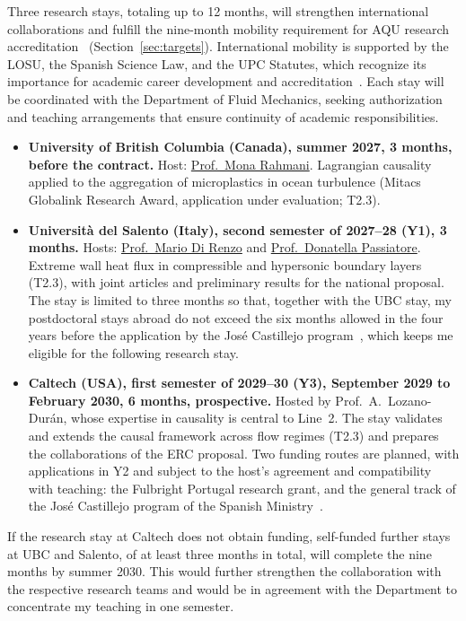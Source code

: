 \documentclass[11pt]{article}
\begin{document}
Three research stays, totaling up to 12 months, will strengthen international collaborations and fulfill the nine-month mobility requirement for AQU research accreditation~\cite{AQU2025} (Section~\ref{sec:targets}).
International mobility is supported by the LOSU, the Spanish Science Law, and the UPC Statutes, which recognize its importance for academic career development and accreditation~\cite{LOSU2023,LCTI2011,UPCStatutes2025}.
Each stay will be coordinated with the Department of Fluid Mechanics, seeking authorization and teaching arrangements that ensure continuity of academic responsibilities.
\begin{itemize}
  \item \textbf{University of British Columbia (Canada), summer 2027, 3 months, before the
  contract.} Host: \href{https://chbe.ubc.ca/mona-rahmani/}{Prof.\ Mona Rahmani}. Lagrangian
  causality applied to the aggregation of microplastics in ocean turbulence (Mitacs Globalink
  Research Award, application under evaluation; T2.3).
  
  \item \textbf{Universit\`a del Salento (Italy), second semester of 2027--28 (Y1), 3 months.} Hosts: \href{https://www.unisalento.it/scheda-utente/-/people/mario.direnzo}{Prof.\ Mario Di Renzo} and \href{https://www.unisalento.it/scheda-utente/-/people/donatella.passiatore}{Prof.\ Donatella Passiatore}. Extreme wall heat flux in compressible and hypersonic boundary layers (T2.3), with joint articles and preliminary results for the national proposal. The stay is limited to three months so that, together with the UBC stay, my postdoctoral stays abroad do not exceed the six months allowed in the four years before the application by the José Castillejo program~\cite{Castillejo2026}, which keeps me eligible for the following research stay.
  
  \item \textbf{Caltech (USA), first semester of 2029--30 (Y3), September 2029 to February 2030, 6 months,
  prospective.} Hosted by Prof.\ A.\ Lozano-Dur\'an, whose expertise in causality is central to Line~2. The stay validates and extends the causal framework across flow regimes (T2.3) and prepares the collaborations of the ERC proposal. Two funding routes are planned, with applications in Y2 and subject to the host's agreement and compatibility with teaching: the Fulbright Portugal research grant, and the general track of the José Castillejo program of the Spanish Ministry~\cite{Castillejo2026}.
\end{itemize}
If the research stay at Caltech does not obtain funding, self-funded further stays at UBC and Salento, of at least three months in total, will complete the nine months by summer 2030. This would further strengthen the collaboration with the respective research teams and would be in agreement with the Department to concentrate my teaching in one semester.
\end{document}
